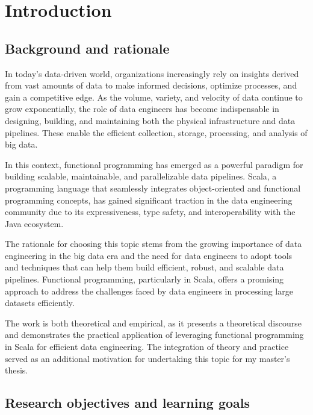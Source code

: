 \setcounter{page}{1}
\chapter*{Introduction}

\section*{Background and rationale}

In today's data-driven world, organizations increasingly rely on insights derived from vast amounts of data to make informed decisions, optimize processes, and gain a competitive edge. As the volume, variety, and velocity of data continue to grow exponentially, the role of data engineers has become indispensable in designing, building, and maintaining both the physical infrastructure and data pipelines. These enable the efficient collection, storage, processing, and analysis of big data.

In this context, functional programming has emerged as a powerful paradigm for building scalable, maintainable, and parallelizable data pipelines. Scala, a programming language that seamlessly integrates object-oriented and functional programming concepts, has gained significant traction in the data engineering community due to its expressiveness, type safety, and interoperability with the Java ecosystem.

The rationale for choosing this topic stems from the growing importance of data engineering in the big data era and the need for data engineers to adopt tools and techniques that can help them build efficient, robust, and scalable data pipelines. Functional programming, particularly in Scala, offers a promising approach to address the challenges faced by data engineers in processing large datasets efficiently.

The work is both theoretical and empirical, as it presents a theoretical discourse and demonstrates the practical application of leveraging functional programming in Scala for efficient data engineering. The integration of theory and practice served as an additional motivation for undertaking this topic for my master's thesis.


\section*{Research objectives and learning goals}

